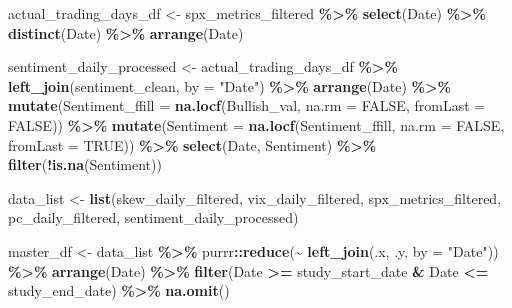 \documentclass[
]{article}
\newenvironment{Shaded}{\begin{snugshade}}{\end{snugshade}}
\newcommand{\AttributeTok}[1]{\textcolor[rgb]{0.13,0.29,0.53}{#1}}
\newcommand{\ConstantTok}[1]{\textcolor[rgb]{0.56,0.35,0.01}{#1}}
\newcommand{\FunctionTok}[1]{\textcolor[rgb]{0.13,0.29,0.53}{\textbf{#1}}}
\newcommand{\NormalTok}[1]{#1}
\newcommand{\OtherTok}[1]{\textcolor[rgb]{0.56,0.35,0.01}{#1}}
\newcommand{\SpecialCharTok}[1]{\textcolor[rgb]{0.81,0.36,0.00}{\textbf{#1}}}
\newcommand{\StringTok}[1]{\textcolor[rgb]{0.31,0.60,0.02}{#1}}
\begin{document}
\begin{Shaded}
\begin{Highlighting}[]
\NormalTok{  actual\_trading\_days\_df }\OtherTok{\textless{}{-}}\NormalTok{ spx\_metrics\_filtered }\SpecialCharTok{\%\textgreater{}\%} 
    \FunctionTok{select}\NormalTok{(Date) }\SpecialCharTok{\%\textgreater{}\%}
    \FunctionTok{distinct}\NormalTok{(Date) }\SpecialCharTok{\%\textgreater{}\%}
    \FunctionTok{arrange}\NormalTok{(Date)}
  
\NormalTok{  sentiment\_daily\_processed }\OtherTok{\textless{}{-}}\NormalTok{ actual\_trading\_days\_df }\SpecialCharTok{\%\textgreater{}\%}
    \FunctionTok{left\_join}\NormalTok{(sentiment\_clean, }\AttributeTok{by =} \StringTok{"Date"}\NormalTok{) }\SpecialCharTok{\%\textgreater{}\%} 
    \FunctionTok{arrange}\NormalTok{(Date) }\SpecialCharTok{\%\textgreater{}\%}
    \FunctionTok{mutate}\NormalTok{(}\AttributeTok{Sentiment\_ffill =} \FunctionTok{na.locf}\NormalTok{(Bullish\_val, }\AttributeTok{na.rm =} \ConstantTok{FALSE}\NormalTok{, }\AttributeTok{fromLast =} \ConstantTok{FALSE}\NormalTok{)) }\SpecialCharTok{\%\textgreater{}\%}
    \FunctionTok{mutate}\NormalTok{(}\AttributeTok{Sentiment =} \FunctionTok{na.locf}\NormalTok{(Sentiment\_ffill, }\AttributeTok{na.rm =} \ConstantTok{FALSE}\NormalTok{, }\AttributeTok{fromLast =} \ConstantTok{TRUE}\NormalTok{)) }\SpecialCharTok{\%\textgreater{}\%}
    \FunctionTok{select}\NormalTok{(Date, Sentiment) }\SpecialCharTok{\%\textgreater{}\%}
    \FunctionTok{filter}\NormalTok{(}\SpecialCharTok{!}\FunctionTok{is.na}\NormalTok{(Sentiment))}
  
\NormalTok{  data\_list }\OtherTok{\textless{}{-}} \FunctionTok{list}\NormalTok{(skew\_daily\_filtered, }
\NormalTok{                    vix\_daily\_filtered, }
\NormalTok{                    spx\_metrics\_filtered, }
\NormalTok{                    pc\_daily\_filtered, }
\NormalTok{                    sentiment\_daily\_processed)}
  
\NormalTok{  master\_df }\OtherTok{\textless{}{-}}\NormalTok{ data\_list }\SpecialCharTok{\%\textgreater{}\%}
\NormalTok{    purrr}\SpecialCharTok{::}\FunctionTok{reduce}\NormalTok{(}\SpecialCharTok{\textasciitilde{}} \FunctionTok{left\_join}\NormalTok{(.x, .y, }\AttributeTok{by =} \StringTok{"Date"}\NormalTok{)) }\SpecialCharTok{\%\textgreater{}\%}
    \FunctionTok{arrange}\NormalTok{(Date) }\SpecialCharTok{\%\textgreater{}\%}
    \FunctionTok{filter}\NormalTok{(Date }\SpecialCharTok{\textgreater{}=}\NormalTok{ study\_start\_date }\SpecialCharTok{\&}\NormalTok{ Date }\SpecialCharTok{\textless{}=}\NormalTok{ study\_end\_date) }\SpecialCharTok{\%\textgreater{}\%}
    \FunctionTok{na.omit}\NormalTok{() }
  

\end{Highlighting}
\end{Shaded}
\end{document}
